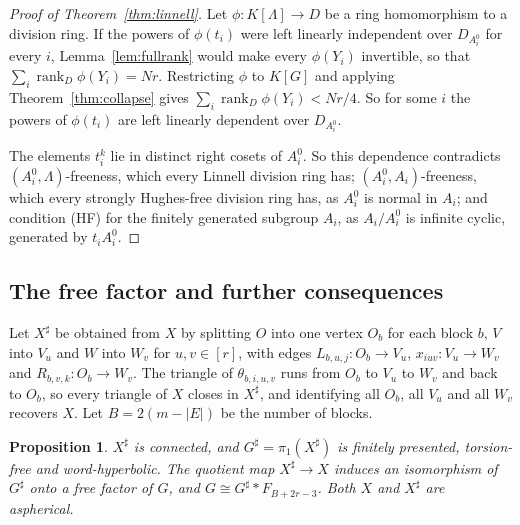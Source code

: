 \documentclass[11pt]{article}
\newtheorem{proposition}[theorem]{Proposition}
\theoremstyle{definition}
\theoremstyle{remark}
\numberwithin{equation}{section}
\DeclareMathOperator{\rank}{rank}
\begin{document}
\begin{proof}[Proof of Theorem~\ref{thm:linnell}]
Let $\phi\colon K[\Lambda]\to D$ be a ring homomorphism to a division ring. If the powers of $\phi(t_i)$ were left linearly independent over $D_{A_i^0}$ for every $i$, Lemma~\ref{lem:fullrank} would make every $\phi(Y_i)$ invertible, so that $\sum_i\rank_D\phi(Y_i)=Nr$. Restricting $\phi$ to $K[G]$ and applying Theorem~\ref{thm:collapse} gives $\sum_i\rank_D\phi(Y_i)<Nr/4$. So for some $i$ the powers of $\phi(t_i)$ are left linearly dependent over $D_{A_i^0}$.

The elements $t_i^k$ lie in distinct right cosets of $A_i^0$. So this dependence contradicts $(A_i^0,\Lambda)$-freeness, which every Linnell division ring has; $(A_i^0,A_i)$-freeness, which every strongly Hughes-free division ring has, as $A_i^0$ is normal in $A_i$; and condition (HF) for the finitely generated subgroup $A_i$, as $A_i/A_i^0$ is infinite cyclic, generated by $t_iA_i^0$.
\end{proof}

\subsection{The free factor and further consequences}\label{sec:structure}

Let $X^\sharp$ be obtained from $X$ by splitting $O$ into one vertex $O_b$ for each block $b$, $V$ into $V_u$ and $W$ into $W_v$ for $u,v\in[r]$, with edges $L_{b,u,j}\colon O_b\to V_u$, $x_{iuv}\colon V_u\to W_v$ and $R_{b,v,k}\colon O_b\to W_v$. The triangle of $\theta_{b,i,u,v}$ runs from $O_b$ to $V_u$ to $W_v$ and back to $O_b$, so every triangle of $X$ closes in $X^\sharp$, and identifying all $O_b$, all $V_u$ and all $W_v$ recovers $X$. Let $B=2(m-|E|)$ be the number of blocks.

\begin{proposition}\label{prop:split}
$X^\sharp$ is connected, and $G^\sharp=\pi_1(X^\sharp)$ is finitely presented, torsion-free and word-hyperbolic. The quotient map $X^\sharp\to X$ induces an isomorphism of $G^\sharp$ onto a free factor of $G$, and $G\cong G^\sharp*F_{B+2r-3}$. Both $X$ and $X^\sharp$ are aspherical.
\end{proposition}
\end{document}
